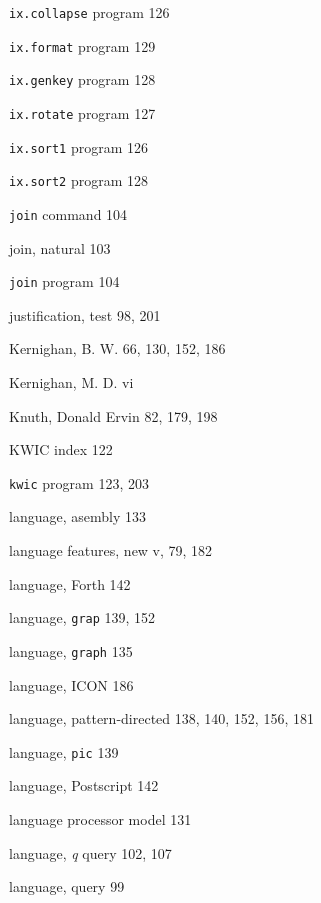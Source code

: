 \begin{multicols}{3}
\hangindent=4pc  \verb'ix.collapse' program 126

\hangindent=4pc  \verb'ix.format' program 129 

\hangindent=4pc  \verb'ix.genkey' program 128 

\hangindent=4pc  \verb'ix.rotate' program 127 

\hangindent=4pc  \verb'ix.sort1' program 126

\hangindent=4pc  \verb'ix.sort2' program 128 

\hangindent=4pc  \verb'join' command 104

\hangindent=4pc  join, natural 103

\hangindent=4pc  \verb'join' program 104

\hangindent=4pc  justification, test 98, 201

\hangindent=4pc  Kernighan, B. W. 66, 130, 152, 186

\hangindent=4pc  Kernighan, M. D. vi 

\hangindent=4pc  Knuth, Donald Ervin 82, 179, 198

\hangindent=4pc  KWIC index 122

\hangindent=4pc  \verb'kwic' program 123, 203

\hangindent=4pc  language, asembly 133

\hangindent=4pc  language features, new v, 79, 182

\hangindent=4pc  language, Forth 142

\hangindent=4pc  language, \verb'grap' 139, 152

\hangindent=4pc  language, \verb'graph' 135

\hangindent=4pc  language, ICON 186

\hangindent=4pc  language, pattern-directed 138, 140, 152, 156, 181

\hangindent=4pc  language, \verb'pic' 139

\hangindent=4pc  language, Postscript 142

\hangindent=4pc  language processor model 131

\hangindent=4pc  language, \textit{q} query 102, 107

\hangindent=4pc  language, query 99


\end{multicols}
